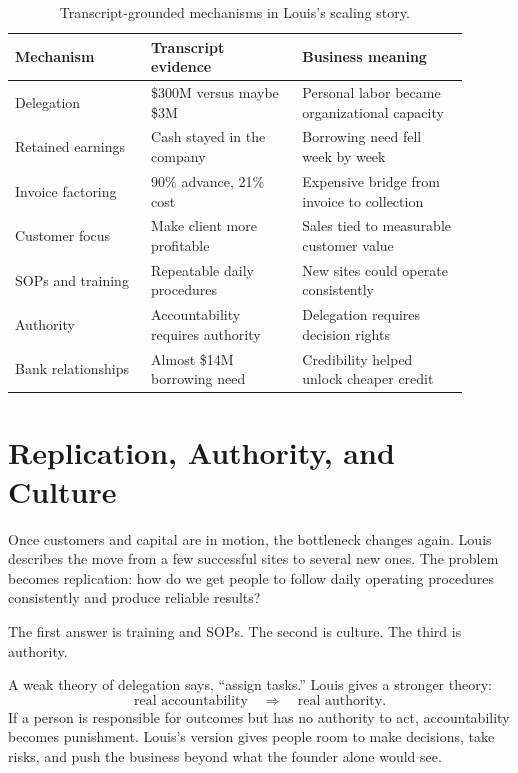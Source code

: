\begin{table}
\centering
\begin{tabular}{p{0.27\linewidth} p{0.30\linewidth} p{0.33\linewidth}}
\hline
Mechanism & Transcript evidence & Business meaning \\
\hline
Delegation & \$300M versus maybe \$3M & Personal labor became organizational capacity \\
Retained earnings & Cash stayed in the company & Borrowing need fell week by week \\
Invoice factoring & 90\% advance, 21\% cost & Expensive bridge from invoice to collection \\
Customer focus & Make client more profitable & Sales tied to measurable customer value \\
SOPs and training & Repeatable daily procedures & New sites could operate consistently \\
Authority & Accountability requires authority & Delegation requires decision rights \\
Bank relationships & Almost \$14M borrowing need & Credibility helped unlock cheaper credit \\
\hline
\end{tabular}
\caption{Transcript-grounded mechanisms in Louis's scaling story.}
\end{table}

\section{Replication, Authority, and Culture}

Once customers and capital are in motion, the bottleneck changes again. Louis describes the move from a few successful sites to several new ones. The problem becomes replication: how do we get people to follow daily operating procedures consistently and produce reliable results?

The first answer is training and SOPs. The second is culture. The third is authority.

A weak theory of delegation says, ``assign tasks.'' Louis gives a stronger theory:
\begin{equation}
\text{real accountability}
\quad\Rightarrow\quad
\text{real authority}.
\end{equation}
If a person is responsible for outcomes but has no authority to act, accountability becomes punishment. Louis's version gives people room to make decisions, take risks, and push the business beyond what the founder alone would see.

